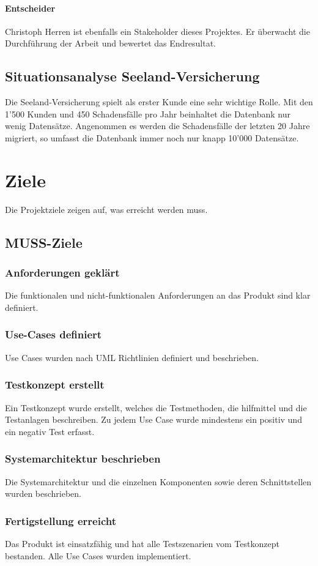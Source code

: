 \documentclass{article}
\begin{document}
\paragraph{Entscheider}
Christoph Herren ist ebenfalls ein Stakeholder dieses Projektes. Er überwacht die Durchführung der Arbeit und bewertet das Endresultat.
\subsection{Situationsanalyse Seeland-Versicherung}
Die Seeland-Versicherung spielt als erster Kunde eine sehr wichtige Rolle. Mit den 1'500 Kunden und 450 Schadensfälle pro Jahr beinhaltet die Datenbank nur wenig Datensätze. Angenommen es werden die Schadensfälle der letzten 20 Jahre migriert, so umfasst die Datenbank immer noch nur knapp 10'000 Datensätze.
\section{Ziele}
Die Projektziele zeigen auf, was erreicht werden muss.
\subsection{MUSS-Ziele}
\subsubsection{Anforderungen geklärt}
Die funktionalen und nicht-funktionalen Anforderungen an das Produkt sind klar definiert.
\subsubsection{Use-Cases definiert}
Use Cases wurden nach UML Richtlinien definiert und beschrieben.
\subsubsection{Testkonzept erstellt}
Ein Testkonzept wurde erstellt, welches die Testmethoden, die hilfmittel und die Testanlagen beschreiben. Zu jedem Use Case wurde mindestens ein positiv und ein negativ Test erfasst.
\subsubsection{Systemarchitektur beschrieben}
Die Systemarchitektur und die einzelnen Komponenten sowie deren Schnittstellen wurden beschrieben.
\subsubsection{Fertigstellung erreicht}
Das Produkt ist einsatzfähig und hat alle Testszenarien vom Testkonzept bestanden. Alle Use Cases wurden implementiert.
\end{document}
